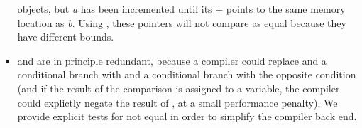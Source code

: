 \begin{itemize}
objects, but \emph{a} has been incremented until its \cbase{} $+$ \coffset{}
points to the same memory location as \emph{b}. Using ,
these pointers will not compare as equal because they have different bounds.
\item
{} and  are in principle redundant,
because a compiler could replace  and a conditional branch
with  and a conditional branch with the opposite condition
(and if the result of the comparison is assigned to a variable, the compiler
could explictly negate the result of , at a small performance
penalty). We provide explicit tests for not equal in order to simplify the
compiler back end.
\end{itemize}
